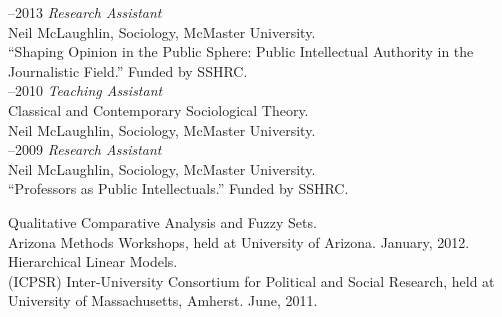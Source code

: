 \documentclass[11pt,usenames,dvipsnames]{article}
\begin{document}
–2013 {\it Research Assistant}\\
Neil McLaughlin, Sociology, McMaster University.\\ 
``Shaping Opinion in the Public Sphere: Public Intellectual Authority in the Journalistic Field.'' Funded by SSHRC.\\

–2010 {\it Teaching Assistant}\\
Classical and Contemporary Sociological Theory.\\
Neil McLaughlin, Sociology, McMaster University.\\

–2009 {\it Research Assistant}\\
Neil McLaughlin, Sociology, McMaster University.\\ 
``Professors as Public Intellectuals.'' Funded by SSHRC.\\






\noindent Qualitative Comparative Analysis and Fuzzy Sets.\\ 
Arizona Methods Workshops, held at University of Arizona. January, 2012.\\

\noindent Hierarchical Linear Models.\\ 
(ICPSR) Inter-University Consortium for Political and Social Research, held at University of Massachusetts, Amherst. June, 2011.\\
\end{document}
